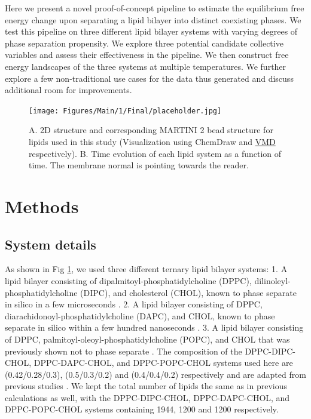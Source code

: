 \documentclass{biophys-new}
\begin{document}
Here we present a novel proof-of-concept pipeline to estimate the equilibrium free energy change upon separating a lipid bilayer into distinct coexisting phases.
We test this pipeline on three different lipid bilayer systems with varying degrees of phase separation propensity.
We explore three potential candidate collective variables and assess their effectiveness in the pipeline.
We then construct free energy landscapes of the three systems at multiple temperatures.
We further explore a few non-traditional use cases for the data thus generated and discuss additional room for improvements.

\begin{figure}[hbt!]
    \centering
    \texttt{[image: Figures/Main/1/Final/placeholder.jpg]}
    \caption{A. 2D structure and corresponding MARTINI 2 bead structure for lipids used in this study (Visualization using ChemDraw and \href{http://www.ks.uiuc.edu/Research/vmd/}{VMD}\cite{Humphrey1996,STON1998} respectively). B. Time evolution of each lipid system as a function of time. The membrane normal is pointing towards the reader.}
    \label{fig1:view}
\end{figure}

\section*{Methods}

\subsection*{System details}

As shown in Fig \ref{fig1:view}, we used three different ternary lipid bilayer systems:
1. A lipid bilayer consisting of dipalmitoyl-phosphatidylcholine (DPPC), dilinoleyl-phosphatidylcholine (DIPC), and cholesterol (CHOL), known to phase separate in silico in a few microseconds \cite{Risselada2008, Schafer2010, Janosi2012, Doma2012, Jong2013, Liu2020, Su2020}.
2. A lipid bilayer consisting of DPPC, diarachidonoyl-phosphatidylcholine (DAPC), and CHOL, known to phase separate in silico within a few hundred nanoseconds \cite{Lin2016, Lin2019, Davis2013a}.
3. A lipid bilayer consisting of DPPC, palmitoyl-oleoyl-phosphatidylcholine (POPC), and CHOL that was previously shown not to phase separate \cite{Veatch2003,Davis2013a}.
The composition of the DPPC-DIPC-CHOL, DPPC-DAPC-CHOL, and DPPC-POPC-CHOL systems used here are (0.42/0.28/0.3), (0.5/0.3/0.2) and (0.4/0.4/0.2) respectively and are adapted from previous studies \cite{Risselada2008, Lin2016, Davis2013a}.
We kept the total number of lipids the same as in previous calculations as well, with the  DPPC-DIPC-CHOL, DPPC-DAPC-CHOL, and DPPC-POPC-CHOL systems containing 1944, 1200 and 1200 respectively.
\end{document}
